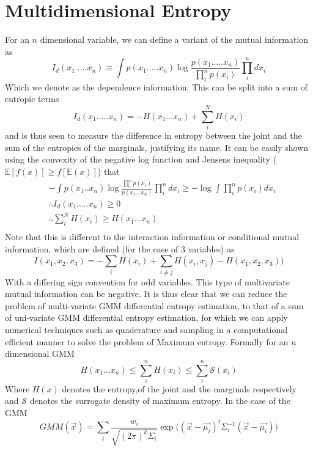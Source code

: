 \documentclass[journal]{IEEEtran}
\begin{document}
\section{Multidimensional Entropy}
For an $n$ dimensional variable, we can define a variant of the mutual information as
\begin{equation}
I_{d}(x_{1}.....x_{n}) \equiv \int p(x_{1}.....x_{n})\log \frac{p(x_{1}.....x_{n})}{\prod_{i}^{n}p(x_{i})}\prod_{i}^{n}dx_{i}
\end{equation}
Which we denote as the dependence information. This can be split into a sum of entropic terms 
\begin{equation}
I_{d}(x_{1}.....x_{n}) = -H(x_{1}...x_{n}) + \sum_{i}^{N}H(x_{i})
\end{equation}
and is thus seen to measure the difference in entropy between the joint and the sum of the entropies of the marginals, justifying its name.
\newline It can be easily shown using the convexity of the negative log function and Jensens inequality ($\mathbb{E}[f(x)]\geq f[\mathbb{E}(x)]$) that
\begin{equation}
\begin{aligned}
& -\int p(x_{1}..x_{n})\log \frac{\prod_{i}^{n}p(x_{i})}{p(x_{1}...x_{n})}\prod_{i}^{n}dx_{i} \geq -\log\int \prod_{i}^{n}p(x_{i})dx_{i}\\
& \therefore I_{d}(x_{1}.....x_{n}) \geq 0 \\
& \therefore \sum_{i}^{N}H(x_{i}) \geq H(x_{1}...x_{n}) \\
\end{aligned}
\end{equation} 
Note that this is different to the interaction information \cite{mcgill1954multivariate} or conditional mutual information, which are defined (for the case of $3$ variables) as
\begin{equation}
I(x_{1},x_{2},x_{3}) = -\sum_{i}H(x_{i})+\sum_{i\neq j}H(x_{i},x_{j})-H(x_{1},x_{2},x_{3}))
\end{equation}
With a differing sign convention for odd variables. This type of multivariate mutual information can be negative. \newline It is thus clear that we can reduce the problem of multi-variate GMM differential entropy estimation, to that of a sum of uni-variate GMM differential entropy estimation, for which we can apply numerical techniques such as quaderature and sampling in a computational efficient manner to solve the problem of Maximum entropy. Formally for an $n$ dimensional GMM
\begin{equation}
H(x_{1}...x_{n}) \leq \sum_{i}^{n}H(x_{i}) \leq \sum_{i}^{n}\mathcal{S}(x_{i})
\end{equation}
Where $H(x)$ denotes the entropy,of the joint and the marginals respectively and $\mathcal{S}$ denotes the surrogate density of maximum entropy. In the case of the GMM
\begin{equation}
GMM(\vec{x}) = \sum_{i}\frac{w_{i}}{\sqrt{(2\pi)^{k}\Sigma_{i}}}\exp\bigg((\vec{x}-\vec{\mu_{i}})^{t}\Sigma^{-1}_{i}(\vec{x}-\vec{\mu_{i}})\bigg)
\end{equation}
\end{document}
